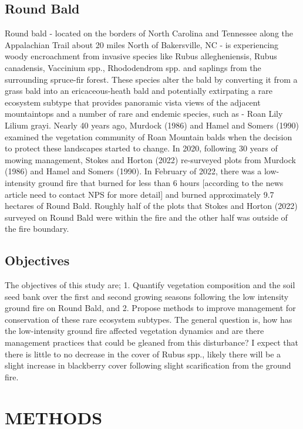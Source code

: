 \documentclass[
]{article}
\begin{document}
\hypertarget{round-bald}{%
\subsection{Round Bald}\label{round-bald}}

Round bald - located on the borders of North Carolina and Tennessee along the Appalachian Trail about 20 miles North of Bakersville, NC - is experiencing woody encroachment from invasive species like Rubus allegheniensis, Rubus canadensis, Vaccinium spp., Rhododendrom spp. and saplings from the surrounding spruce-fir forest. These species alter the bald by converting it from a grass bald into an ericaceous-heath bald and potentially extirpating a rare ecosystem subtype that provides panoramic vista views of the adjacent mountaintops and a number of rare and endemic species, such as - Roan Lily Lilium grayi. Nearly 40 years ago, Murdock (1986) and Hamel and Somers (1990) examined the vegetation community of Roan Mountain balds when the decision to protect these landscapes started to change. In 2020, following 30 years of mowing management, Stokes and Horton (2022) re-surveyed plots from Murdock (1986) and Hamel and Somers (1990). In February of 2022, there was a low-intensity ground fire that burned for less than 6 hours {[}according to the news article need to contact NPS for more detail{]} and burned approximately 9.7 hectares of Round Bald. Roughly half of the plots that Stokes and Horton (2022) surveyed on Round Bald were within the fire and the other half was outside of the fire boundary.

\hypertarget{objectives}{%
\subsection{Objectives}\label{objectives}}

The objectives of this study are; 1. Quantify vegetation composition and the soil seed bank over the first and second growing seasons following the low intensity ground fire on Round Bald, and 2. Propose methods to improve management for conservation of these rare ecosystem subtypes. The general question is, how has the low-intensity ground fire affected vegetation dynamics and are there management practices that could be gleaned from this disturbance? I expect that there is little to no decrease in the cover of Rubus spp., likely there will be a slight increase in blackberry cover following slight scarification from the ground fire.

\hypertarget{methods}{%
\section{METHODS}\label{methods}}
\end{document}
